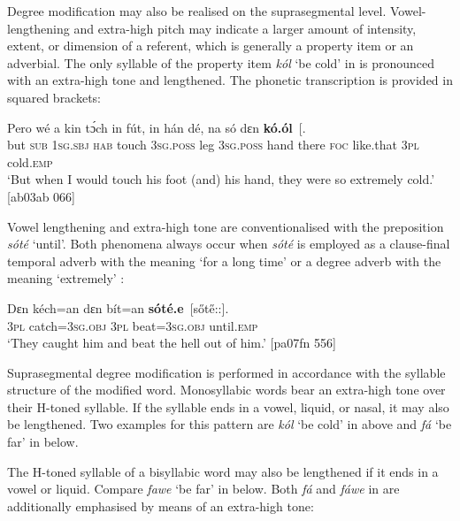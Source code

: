 Degree modification may also be realised on the suprasegmental level. Vowel-lengthening and extra-high pitch may indicate a larger amount of intensity, extent, or dimension of a referent, which is generally a property item or an adverbial. The only syllable of the property item \textit{kól} ‘be cold’ in  is pronounced with an extra-high tone and lengthened. The phonetic transcription is provided in squared brackets: 



\ea%
    \label{ex:key:893}
    \gll Pero    wé  a    kin  tɔ́ch    in    fút,
in    hán    dé,    na  só    dɛn  \textbf{kó.ól}~[\textstylePichiexamplenumberZchnZchn{k\H{o}::l]}.\\
but    \textsc{sub}  \textsc{1sg.sbj}  \textsc{hab}  touch  \textsc{3sg.poss}  leg
\textsc{3sg.poss}  hand  there  \textsc{foc}  like.that  \textsc{3pl}  cold.\textsc{emp}\\

\glt ‘But when I would touch his foot (and) his hand,
they were so extremely cold.’ [ab03ab 066]
\z

Vowel lengthening and extra-high tone are conventionalised with the preposition \textit{sóté} ‘until’. Both phenomena always occur when \textit{sóté} is employed as a clause-final temporal adverb with the meaning ‘for a long time’ or a degree adverb with the meaning ‘extremely’ :


\ea%
    \label{ex:key:894}
    \gll Dɛn  kéch=an    dɛn  bít=an    \textbf{sóté.e}~[s\H{o}t\H{e}::].\\
\textsc{3pl}  catch=\textsc{3sg.obj}  \textsc{3pl}  beat=\textsc{3sg.obj}  until.\textsc{emp}\\

\glt ‘They caught him and beat the hell out of him.’ [pa07fn 556]
\z

Suprasegmental degree modification is performed in accordance with the syllable structure of the modified word. Monosyllabic words bear an extra-high tone over their H-toned syllable. If the syllable ends in a vowel, liquid, or nasal, it may also be lengthened. Two examples for this pattern are \textit{kól} ‘be cold’ in  above and \textit{fá} ‘be far’ in  below.


The H-toned syllable of a bisyllabic word may also be lengthened if it ends in a vowel or liquid. Compare \textit{fawe} ‘be far’ in  below. Both \textit{fá} and \textit{fáwe} in  are additionally emphasised by means of an extra-high tone: 



